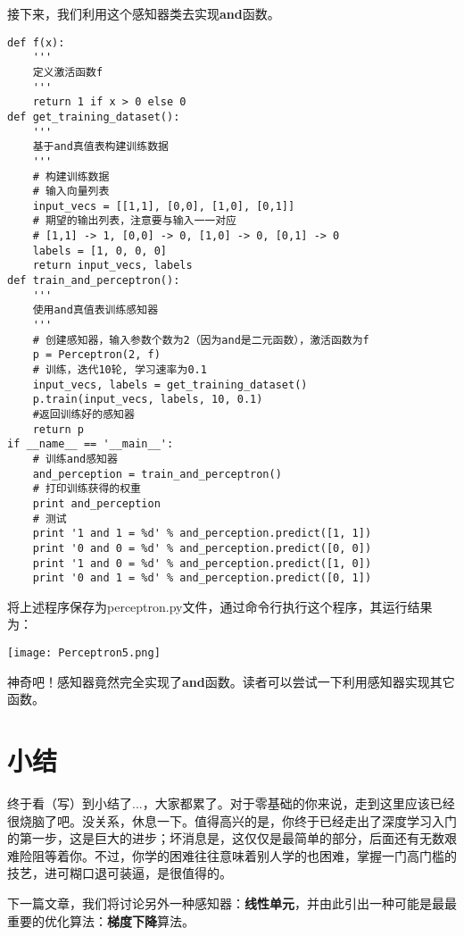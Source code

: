 接下来，我们利用这个感知器类去实现\textcolor{main}{\textbf{and}}函数。
\begin{lstlisting}
def f(x):
    '''
    定义激活函数f
    '''
    return 1 if x > 0 else 0
def get_training_dataset():
    '''
    基于and真值表构建训练数据
    '''
    # 构建训练数据
    # 输入向量列表
    input_vecs = [[1,1], [0,0], [1,0], [0,1]]
    # 期望的输出列表，注意要与输入一一对应
    # [1,1] -> 1, [0,0] -> 0, [1,0] -> 0, [0,1] -> 0
    labels = [1, 0, 0, 0]
    return input_vecs, labels    
def train_and_perceptron():
    '''
    使用and真值表训练感知器
    '''
    # 创建感知器，输入参数个数为2（因为and是二元函数），激活函数为f
    p = Perceptron(2, f)
    # 训练，迭代10轮, 学习速率为0.1
    input_vecs, labels = get_training_dataset()
    p.train(input_vecs, labels, 10, 0.1)
    #返回训练好的感知器
    return p
if __name__ == '__main__': 
    # 训练and感知器
    and_perception = train_and_perceptron()
    # 打印训练获得的权重
    print and_perception
    # 测试
    print '1 and 1 = %d' % and_perception.predict([1, 1])
    print '0 and 0 = %d' % and_perception.predict([0, 0])
    print '1 and 0 = %d' % and_perception.predict([1, 0])
    print '0 and 1 = %d' % and_perception.predict([0, 1])
\end{lstlisting}

将上述程序保存为perceptron.py文件，通过命令行执行这个程序，其运行结果为：

\texttt{[image: Perceptron5.png]}

神奇吧！感知器竟然完全实现了\textcolor{main}{\textbf{and}}函数。读者可以尝试一下利用感知器实现其它函数。

\section{小结}

终于看（写）到小结了...，大家都累了。对于零基础的你来说，走到这里应该已经很烧脑了吧。没关系，休息一下。值得高兴的是，你终于已经走出了深度学习入门的第一步，这是巨大的进步；坏消息是，这仅仅是最简单的部分，后面还有无数艰难险阻等着你。不过，你学的困难往往意味着别人学的也困难，掌握一门高门槛的技艺，进可糊口退可装逼，是很值得的。

下一篇文章，我们将讨论另外一种感知器：\textbf{线性单元}，并由此引出一种可能是最最重要的优化算法：\textbf{梯度下降}算法。